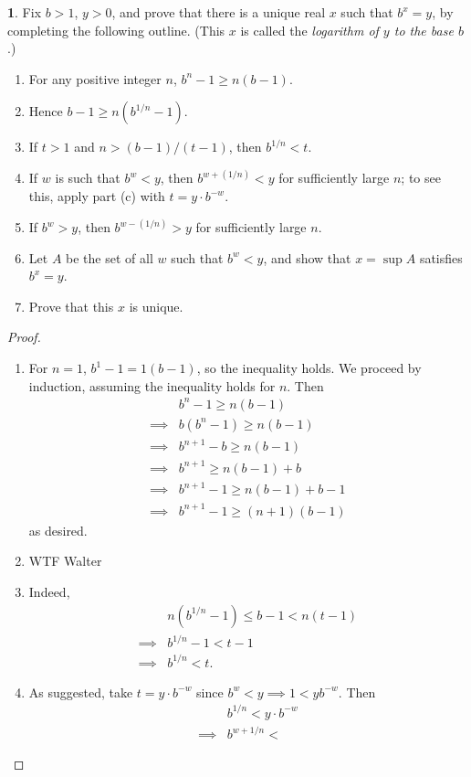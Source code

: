 \documentclass[12pt]{article}
\theoremstyle{definition}
\newtheorem{ex}{}
\begin{document}
\begin{ex}
	Fix $b > 1$, $y > 0$, and prove that there is a unique real $x$ such that $b^x = y$, by completing the following outline.
	(This $x$ is called the \textit{logarithm of $y$ to the base $b$}.)
	\begin{enumerate}[label=(\alph*)]
		\item
		      For any positive integer $n$, $b^n - 1 \geq n(b-1)$.
		\item Hence $b - 1 \geq n(b^{1/n} - 1)$.
		\item If $t > 1$ and $n > (b - 1)/(t - 1)$, then $b^{1/n} < t$.
		\item If $w$ is such that $b^w < y$, then $b^{w + (1/n)} < y$ for sufficiently large $n$; to see this, apply part (c) with $t = y \cdot b^{-w}$.
		\item If $b^w > y$, then $b^{w - (1/n)} > y$ for sufficiently large $n$.
		\item Let $A$ be the set of all $w$ such that $b^w < y$, and show that $x = \sup A$ satisfies $b^x = y$.
		\item Prove that this $x$ is unique.
	\end{enumerate}
\end{ex}
\begin{proof}
	\begin{enumerate}[label=(\alph*)]
		\item For $n = 1$, $b^1 - 1 = 1(b - 1)$, so the inequality holds.
		      We proceed by induction, assuming the inequality holds for $n$.
		      Then \begin{align*}
			               & b^n - 1 \geq n(b - 1)               \\
			      \implies & b(b^n - 1) \geq n(b - 1)            \\
			      \implies & b^{n + 1} - b \geq n(b - 1)         \\
			      \implies & b^{n + 1} \geq n(b - 1) + b         \\
			      \implies & b^{n + 1} - 1 \geq n(b - 1) + b - 1 \\
			      \implies & b^{n + 1} - 1 \geq (n + 1)(b - 1)
		      \end{align*}
		      as desired.
		\item WTF Walter
		\item Indeed, \begin{align*}
			               & n(b^{1/n} - 1) \leq b - 1 < n(t - 1) \\
			      \implies & b^{1/n} - 1 < t - 1                  \\
			      \implies & b^{1/n} < t.
		      \end{align*}
		\item As suggested, take $t = y \cdot b^{-w}$ since $b^w < y \implies 1 < yb^{-w}$.
		      Then \begin{align*}
			               & b^{1/n} < y \cdot b^{-w} \\
			      \implies & b^{w + 1/n} <
		      \end{align*}
	\end{enumerate}
\end{proof}
\end{document}
